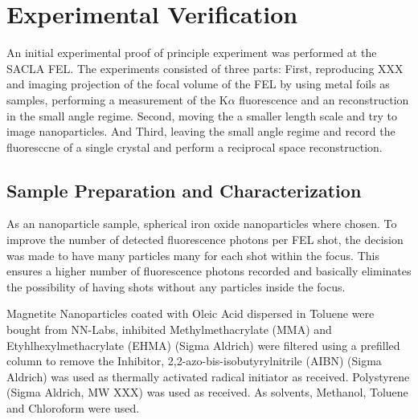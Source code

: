\chapter{Experimental Verification}
An initial experimental proof of principle experiment was performed at the SACLA FEL.
The experiments consisted of three parts: First, reproducing XXX and imaging projection of the focal volume of the FEL by using metal foils as samples, performing a measurement of the K$\alpha$  fluorescence and an reconstruction in the small angle regime. Second, moving the a smaller length scale and try to image nanoparticles. And Third, leaving the small angle regime and record the fluoresccne of a single crystal and perform a reciprocal space reconstruction.
\section{Sample Preparation and Characterization}
As an nanoparticle sample, spherical iron oxide nanoparticles where chosen. To improve the number of detected fluorescence photons per FEL shot, the decision was made to have many particles many for each shot within the focus. This ensures a higher number of fluorescence photons recorded and basically eliminates the possibility of having shots without any particles inside the focus. 

Magnetite Nanoparticles coated with Oleic Acid dispersed in Toluene were bought from NN-Labs, inhibited Methylmethacrylate (MMA) and Etyhlhexylmethacrylate (EHMA)  (Sigma Aldrich) were filtered using a prefilled column to remove the Inhibitor,  2,2-azo-bis-isobutyrylnitrile (AIBN) (Sigma Aldrich) was used as thermally activated radical initiator as received. Polystyrene (Sigma Aldrich, MW XXX) was used as received. As solvents, Methanol, Toluene and Chloroform were used.

